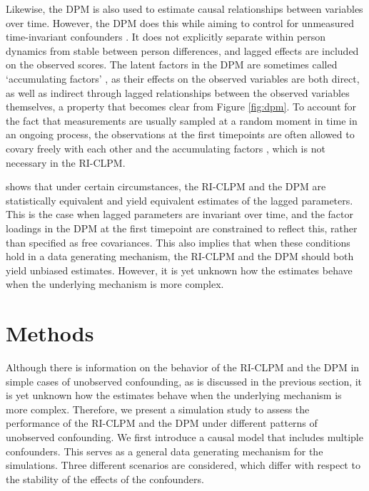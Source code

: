 \documentclass[
  a4paper,
  stu,
  floatsintext,
  donotrepeattitle]{apa7}
\begin{document}
Likewise, the DPM is also used to estimate causal relationships between
variables over time. However, the DPM does this while aiming to control
for unmeasured time-invariant confounders \autocite{allison2017}. It
does not explicitly separate within person dynamics from stable between
person differences, and lagged effects are included on the observed
scores. The latent factors in the DPM are sometimes called `accumulating
factors' \autocite{usami2019}, as their effects on the observed
variables are both direct, as well as indirect through lagged
relationships between the observed variables themselves, a property that
becomes clear from Figure \ref{fig:dpm}. To account for the fact that
measurements are usually sampled at a random moment in time in an
ongoing process, the observations at the first timepoints are often
allowed to covary freely with each other and the accumulating factors
\autocite{hamaker2005}, which is not necessary in the RI-CLPM.

\textcite{hamaker2005} shows that under certain circumstances, the
RI-CLPM and the DPM are statistically equivalent and yield equivalent
estimates of the lagged parameters. This is the case when lagged
parameters are invariant over time, and the factor loadings in the DPM
at the first timepoint are constrained to reflect this, rather than
specified as free covariances. This also implies that when these
conditions hold in a data generating mechanism, the RI-CLPM and the DPM
should both yield unbiased estimates. However, it is yet unknown how the
estimates behave when the underlying mechanism is more complex.

\hypertarget{methods}{%
\section{Methods}\label{methods}}

Although there is information on the behavior of the RI-CLPM and the DPM
in simple cases of unobserved confounding, as is discussed in the
previous section, it is yet unknown how the estimates behave when the
underlying mechanism is more complex. Therefore, we present a simulation
study to assess the performance of the RI-CLPM and the DPM under
different patterns of unobserved confounding. We first introduce a
causal model that includes multiple confounders. This serves as a
general data generating mechanism for the simulations. Three different
scenarios are considered, which differ with respect to the stability of
the effects of the confounders.
\end{document}
